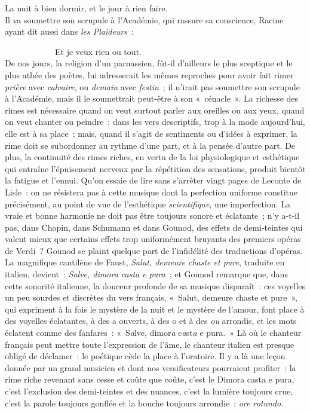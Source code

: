 \documentclass[french,twoside]{book} %
\begin{document}
La nuit à bien dormir, et le jour à rien faire.\\

\noindent Il va soumettre son scrupule à l’Académie, qui rassure sa conscience, Racine ayant dit aussi dans \emph{les Plaideurs} :\par

            Et je veux rien ou tout.\\

\noindent De nos jours, la religion d’un parnassien, fût-il d’ailleurs le plus sceptique et le plus athée des poètes, lui adresserait les mêmes reproches pour avoir fait rimer \emph{prière} avec \emph{calvaire}, ou \emph{demain} avec \emph{festin} ; il n’irait pas soumettre son scrupule à l’Académie, mais il le soumettrait peut-être à son « cénacle ». La richesse des rimes est nécessaire quand on veut surtout parler aux oreilles ou aux yeux, quand on veut chanter ou peindre ; dans les vers descriptifs, trop à la mode aujourd’hui, elle est à sa place ; mais, quand il s’agit de sentiments ou d’idées à exprimer, la rime doit se subordonner au rythme d’une part, et à la pensée d’autre part. De plus, la continuité des rimes riches, en vertu de la loi physiologique et esthétique qui entraîne l’épuisement nerveux par la répétition des sensations, produit bientôt la fatigue et l’ennui. Qu’on essaie de lire sans s’arrêter vingt pages de Leconte de Lisle : on ne résistera pas à cette musique dont la perfection uniforme constitue précisément, au point de vue de l’esthétique \emph{scientifique}, une imperfection. La vraie et bonne harmonie ne doit pas être toujours sonore et éclatante ; n’y a-t-il pas, dans Chopin, dans Schumann et dans Gounod, des effets de demi-teintes qui valent mieux que certains effets trop uniformément bruyants des premiers opéras de Verdi ? Gounod se plaint quelque part de l’infidélité des traductions d’opéras. La magnifique cantilène de Faust, \emph{Salut, demeure chaste et pure}, traduite en italien, devient : \emph{Salve, dimora casta e pura} ; et Gounod remarque que, dans cette sonorité italienne, la douceur profonde de sa musique disparaît : ces voyelles un peu sourdes et discrètes du vers français, « Salut, demeure chaste et pure », qui expriment à la fois le mystère de la nuit et le mystère de l’amour, font place à des voyelles éclatantes, à des a ouverts, à des o et à des \emph{ou} arrondis, et les mots éclatent comme des fanfares : « S\emph{a}lve, dimor\emph{a} c\emph{a}st\emph{a} e pura. » Là où le chanteur français peut mettre toute l’expression de l’âme, le chanteur italien est presque obligé de déclamer : le poétique cède la place à l’oratoire. Il y a là une leçon donnée par un grand musicien et dont nos versificateurs pourraient profiter : la rime riche revenant sans cesse et coûte que coûte, c’est le Dimora casta e pura, c’est l’exclusion des demi-teintes et des nuances, c’est la lumière toujours crue, c’est la parole toujours gonflée et la bouche toujours arrondie : \emph{ore rotundo.}\par
\end{document}

